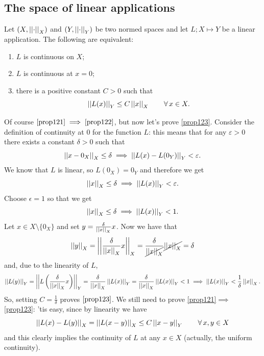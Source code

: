 \documentclass{article}
\begin{document}
\subsection{The space of linear applications}
\begin{proposition}
	Let $(X,\left|\left|\cdot\right|\right|_X)$ and $(Y,\left|\left|\cdot\right|\right|_Y)$ be two normed spaces and let $L;X\mapsto Y$ be a linear application. The following are equivalent:
	\begin{enumerate}[\circnum]
		\item\label{prop121}$L$ is continuous on $X$;
		\item \label{prop122}$L$ is continuous at $x=0$;
		\item\label{prop123}there is a positive constant $C>0$ such that
		\[
		\left|\left|L(x)\right|\right|_Y\leq C\left|\left|x\right|\right|_X\qquad\forall\, x\in X.
		\]
	\end{enumerate}
\end{proposition} 
\begin{fancyproof}
	Of course $\ref{prop121}\implies\ref{prop122}$, but now let's prove \ref{prop123}. Consider the definition of continuity at 0 for the function $L$: this means that for any $\varepsilon>
	0$ there exists a constant $\delta>0$ such that
	\[
	\left|\left|x-0_X\right|\right|_X\leq\delta\implies\left|\left|L(x)-L(0_Y)\right|\right|_Y<\varepsilon.
	\]
	We know that $L$ is linear, so $L(0_X)=0_Y$ and therefore we get
	\begin{equation*}
		\left|\left|x\right|\right|_X\leq\delta\implies\left|\left|L(x)\right|\right|_Y<\varepsilon.
	\end{equation*}
	Choose $\epsilon=1$ so that we get 
	\begin{equation*}
		\left|\left|x\right|\right|_X\leq\delta\implies\left|\left|L(x)\right|\right|_Y<1.
	\end{equation*}
	Let $x\in X\setminus\{0_X\}$ and set $y=\frac{\delta}{\left|\left|x\right|\right|_X}x$. Now we have that
	\begin{equation*}
		\left|\left|y\right|\right|_X=\left|\left|\frac{\delta}{\left|\left|x\right|\right|_X}x\right|\right|_{X}=\frac{\delta}{\cancel{\left|\left|x\right|\right|_X}}\cancel{\left|\left|x\right|\right|_X}=\delta
	\end{equation*}
	and, due to the linearity of $L$,
	\begin{equation*}
		\left|\left|L(y)\right|\right|_Y=\left|\left|L\left(\frac{\delta}{\left|\left|x\right|\right|_X}x\right)\right|\right|_Y=\frac{\delta}{\left|\left|x\right|\right|_X}\left|\left|L(x)\right|\right|_Y=\frac{\delta}{\left|\left|x\right|\right|_X}\left|\left|L(x)\right|\right|_Y<1\implies\left|\left|L(x)\right|\right|_Y<\frac{1}{\delta}\left|\left|x\right|\right|_X.
	\end{equation*}
	So, setting $C=\frac{1}{\delta}$ proves $\ref{prop123}$. We still need to prove \ref{prop121}$\implies$\ref{prop123}: 'tis easy, since by linearity we have
	\begin{equation*}
		\left|\left|L(x)-L(y)\right|\right|_{X}=\left|\left|L(x-y)\right|\right|_X\leq C\left|\left|x-y\right|\right|_Y\qquad\forall\, x,y\in X
	\end{equation*}
	and this clearly implies the continuity of $L$ at any $x\in X$ (actually, the uniform continuity).
\end{fancyproof}
\end{document}
